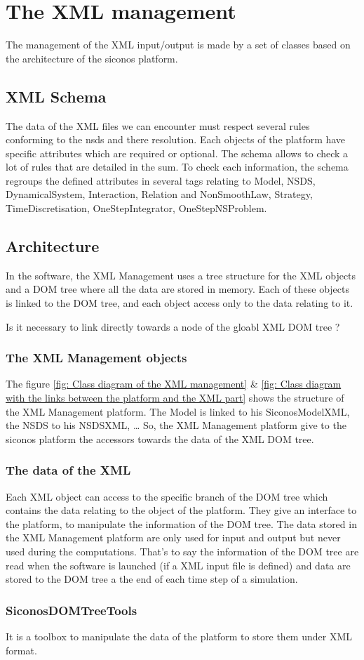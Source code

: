 \section{The XML management}

The management of the XML input/output is made by a set of classes based on the architecture of the
\ac{siconos} platform.

\subsection{XML Schema}
The data of the XML files we can encounter must respect several rules conforming to the \ac{nsds}
and there resolution. Each objects of the platform have specific attributes which are required
or optional. The schema allows to check a lot of rules that are detailed in the \ac{sum}.
To check each information, the schema regroups the defined attributes in several tags relating to
Model, NSDS, DynamicalSystem, Interaction, Relation and NonSmoothLaw, Strategy, TimeDiscretisation,
OneStepIntegrator, OneStepNSProblem.

\subsection{Architecture}
In the software, the XML Management uses a tree structure for the XML objects and a DOM tree where all the data are stored in memory. Each of these objects is linked to the DOM tree, and each object access only to the data relating to it.

\begin{ndr}
  Is it necessary to link directly towards a node of the gloabl XML DOM tree ?
\end{ndr}

\subsubsection{The XML Management objects}
The figure \ref{fig: Class diagram of the XML management} \& \ref{fig: Class diagram with the links between the platform and the XML part} shows the
structure of the XML Management platform.
The Model is linked to his SiconosModelXML, the NSDS to his NSDSXML, \dots
So, the XML Management platform give to the \ac{siconos} platform the accessors towards the data of the XML DOM tree.
\subsubsection{The data of the XML}
Each XML object can access to the specific branch of the DOM tree which contains the data relating to
the object of the platform. They give an interface to the platform, to manipulate the information of
the DOM tree.
The data stored in the XML Management platform are only used for input and output but never used during the
computations. That's to say the information of the DOM tree are read when the software is launched (if a XML input file is
defined) and data are stored to the DOM tree a the end of each time step of a simulation.
\subsubsection{SiconosDOMTreeTools}
It is a toolbox to manipulate the data of the platform to store them under XML format.

